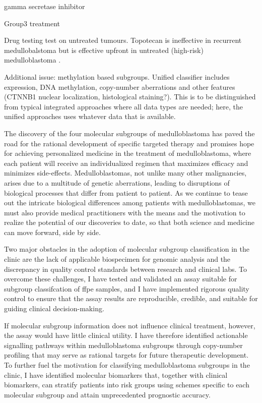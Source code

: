 gamma secretase inhibitor 

Group3 treatment 


Drug testing
test on untreated tumours. Topotecan is ineffective in recurrent medullobalstoma  but is effective upfront in untreated (high-risk) medulloblastoma .

Additional issue: methylation based subgroups. Unified classifier includes expression, DNA methylation, copy-number aberrations and other features (CTNNB1 nuclear localization, histological staining?). This is to be distinguished from typical integrated approaches where all data types are needed; here, the unified approaches uses whatever data that is available.

The discovery of the four molecular subgroups of medulloblastoma has paved the road for the rational development of specific targeted therapy and promises hope for achieving personalized medicine in the treatment of medulloblastoma, where each patient will receive an individualized regimen that maximizes efficacy and minimizes side-effects. Medulloblastomas, not unlike many other malignancies, arises due to a multitude of genetic aberrations, leading to disruptions of biological processes that differ from patient to patient. As we continue to tease out the intricate biological differences among patients with medulloblastomas, we must also provide medical practitioners with the means and the motivation to realize the potential of our discoveries to date, so that both science and medicine can move forward, side by side.

Two major obstacles in the adoption of molecular subgroup classification in the clinic are the lack of applicable biospecimen for genomic analysis and the discrepancy in quality control standards between research and clinical labs. To overcome these challenges, I have tested and validated an assay suitable for subgroup classifcation of \gls{ffpe} samples, and I have implemented rigorous quality control to ensure that the assay results are reproducible, credible, and suitable for guiding clinical decision-making.

If molecular subgroup information does not influence clinical treatment, however, the assay would have little clinical utility. I have therefore identified actionable signalling pathways within medulloblastoma subgroups through copy-number profiling that may serve as rational targets for future therapeutic development. To further fuel the motivation for classifying medulloblastoma subgroups in the clinic, I have identified molecular biomarkers that, together with clinical biomarkers, can stratify patients into risk groups using schemes specific to each molecular subgroup and attain unprecedented prognostic accuracy.

